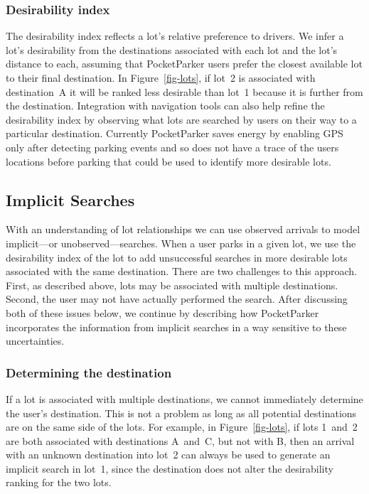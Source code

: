 \documentclass{sigchi}
\begin{document}
\subsubsection{Desirability index}

The desirability index reflects a lot's relative preference to drivers. We
infer a lot's desirability from the destinations associated with each lot and
the lot's distance to each, assuming that PocketParker users prefer the
closest available lot to their final destination. In Figure~\ref{fig-lots},
if lot~2 is associated with destination~A it will be ranked less desirable
than lot~1 because it is further from the destination. Integration with
navigation tools can also help refine the desirability index by observing
what lots are searched by users on their way to a particular destination.
Currently PocketParker saves energy by enabling GPS only after detecting
parking events and so does not have a trace of the users locations before
parking that could be used to identify more desirable lots.

\subsection{Implicit Searches}

With an understanding of lot relationships we can use observed arrivals to
model implicit---or unobserved---searches. When a user parks in a given lot,
we use the desirability index of the lot to add unsuccessful searches in more
desirable lots associated with the same destination. There are two challenges
to this approach. First, as described above, lots may be associated with
multiple destinations. Second, the user may not have actually performed the
search. After discussing both of these issues below, we continue by
describing how PocketParker incorporates the information from implicit
searches in a way sensitive to these uncertainties.

\subsubsection{Determining the destination}

If a lot is associated with multiple destinations, we cannot immediately
determine the user's destination.  This is not a problem as long as all
potential destinations are on the same side of the lots.  For example, in
Figure~\ref{fig-lots}, if lots 1~and~2 are both associated with destinations
A~and~C, but not with B, then an arrival with an unknown destination into lot~2
can always be used to generate an implicit search in lot~1, since the
destination does not alter the desirability ranking for the two lots.
\end{document}
